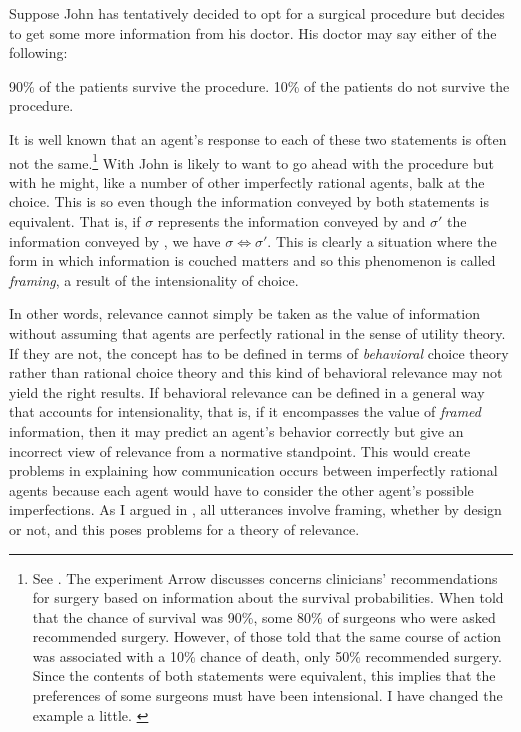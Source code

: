 
Suppose John has tentatively decided to opt for a surgical procedure but decides to get some more information from his doctor. His doctor may say either of the following:

\ea
\ea\label{ex:13:2a} 90\% of the patients survive the procedure.
\ex\label{ex:13:2b} 10\% of the patients do not survive the procedure.
\z
\z

It is well known that an agent's response to each of these two statements is often not the same.\footnote{See \citet{arrow:rppe}. The experiment Arrow discusses concerns clinicians' recommendations for surgery based on information about the survival probabilities. When told that the chance of survival was 90\%, some 80\% of surgeons who were asked recommended surgery. However, of those told that the same course of action was associated with a 10\% chance of death, only 50\% recommended surgery. Since the contents of both statements were equivalent, this implies that the preferences of some surgeons must have been intensional. I have changed the example a little. \label{foot:arrow}} With  John is likely to want to go ahead with the procedure but with  he might, like a number of other imperfectly rational agents, balk at the choice. This is so even though the information conveyed by both statements is equivalent. That is, if $\sigma$ represents the information conveyed by  and $\sigma'$ the information conveyed by , we have $\sigma \Longleftrightarrow \sigma'$. This is clearly a situation where the form in which information is couched matters and so this phenomenon is called \emph{framing}, a result of the intensionality of choice.

In other words, relevance cannot simply be taken as the value of information without assuming that agents are perfectly rational in the sense of utility theory. If they are not, the concept has to be defined in terms of \emph{behavioral} choice theory rather than rational choice theory and this kind of behavioral relevance may not yield the right results. If behavioral relevance can be defined in a general way that accounts for intensionality, that is, if it encompasses the value of \emph{framed} information, then it may predict an agent's behavior correctly but give an incorrect view of relevance from a normative standpoint. This would create problems in explaining how communication occurs between imperfectly rational agents because each agent would have to consider the other agent's possible imperfections. As I argued in , all utterances involve framing, whether by design or not, and this poses problems for a theory of relevance. 

